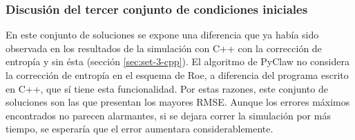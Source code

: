 \subsubsection{Discusión del tercer conjunto de condiciones iniciales}
En este conjunto de soluciones se expone una diferencia que ya había sido observada en los resultados de la simulación con C++ con la corrección de entropía y sin ésta (sección \ref{sec:set-3-cpp}). El algoritmo de PyClaw no considera la corrección de entropía en el esquema de Roe, a diferencia del programa escrito en C++, que sí tiene esta funcionalidad. Por estas razones, este conjunto de soluciones son las que presentan los mayores RMSE. Aunque los errores máximos encontrados no parecen alarmantes, si se dejara correr la simulación por más tiempo, se esperaría que el error aumentara considerablemente. 